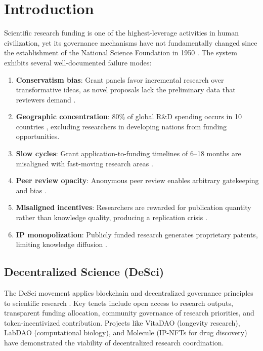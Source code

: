 \section{Introduction}

\label{sec:introduction}

Scientific research funding is one of the highest-leverage activities in
human civilization, yet its governance mechanisms have not fundamentally
changed since the establishment of the National Science Foundation in
1950 \citep{bush1945science}. The system exhibits several well-documented
failure modes:

\begin{enumerate}[label=(\roman*)]
  \item \textbf{Conservatism bias}: Grant panels favor incremental
    research over transformative ideas, as novel proposals lack the
    preliminary data that reviewers demand \citep{boudreau2016looking}.
  \item \textbf{Geographic concentration}: 80\% of global R\&D spending
    occurs in 10 countries \citep{unesco2021science}, excluding
    researchers in developing nations from funding opportunities.
  \item \textbf{Slow cycles}: Grant application-to-funding timelines of
    6--18 months are misaligned with fast-moving research areas
    \citep{alberts2014rescuing}.
  \item \textbf{Peer review opacity}: Anonymous peer review enables
    arbitrary gatekeeping and bias \citep{lee2013bias}.
  \item \textbf{Misaligned incentives}: Researchers are rewarded for
    publication quantity rather than knowledge quality, producing a
    replication crisis \citep{ioannidis2005most}.
  \item \textbf{IP monopolization}: Publicly funded research generates
    proprietary patents, limiting knowledge diffusion
    \citep{heller1998can}.
\end{enumerate}

\subsection{Decentralized Science (DeSci)}

The DeSci movement applies blockchain and decentralized governance
principles to scientific research \citep{hamburg2019desci}. Key tenets
include open access to research outputs, transparent funding allocation,
community governance of research priorities, and token-incentivized
contribution. Projects like VitaDAO (longevity research), LabDAO
(computational biology), and Molecule (IP-NFTs for drug discovery)
have demonstrated the viability of decentralized research coordination.

